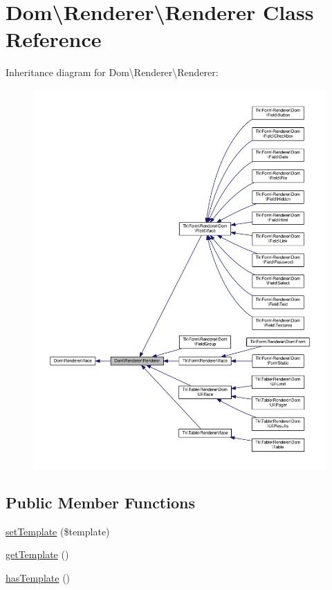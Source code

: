 \hypertarget{classDom_1_1Renderer_1_1Renderer}{\section{Dom\textbackslash{}Renderer\textbackslash{}Renderer Class Reference}
\label{classDom_1_1Renderer_1_1Renderer}
}


Inheritance diagram for Dom\textbackslash{}Renderer\textbackslash{}Renderer\+:\nopagebreak
\begin{figure}[H]
\begin{center}
\leavevmode
\includegraphics[width=350pt]{classDom_1_1Renderer_1_1Renderer__inherit__graph}
\end{center}
\end{figure}
\subsection*{Public Member Functions}
\begin{DoxyCompactItemize}
\item 
\hyperlink{classDom_1_1Renderer_1_1Renderer_a3c9549e694a794e55d920da28570397f}{set\+Template} (\$template)
\item 
\hyperlink{classDom_1_1Renderer_1_1Renderer_a103355306876ef3a764911483c0a09ec}{get\+Template} ()
\item 
\hyperlink{classDom_1_1Renderer_1_1Renderer_aa098f670e0414ab3cf1563a41b67f8ce}{has\+Template} ()
\end{DoxyCompactItemize}
